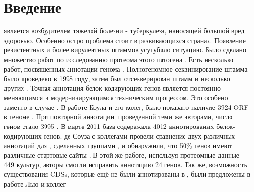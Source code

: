 \section{Введение}
 является возбудителем тяжелой болезни - туберкулеза, наносящей большой вред здоровью. Особенно остро проблема стоит в развивающихся странах. Появление резистентных и более вирулентных штаммов усугубило ситуацию. Было сделано множество работ по исследованию протеома этого патогена \cite{jungblut1999comparative, mattow2006proteins}. Есть несколько работ, посвященных аннотации генома . Полногеномное секвинирование штамма  было проведено в 1998 году, затем был отсекверирован штамм  и несколько других \cite{cole1998erratum, fleischmann2002whole}. Точная аннотация белок-кодирующих генов является постоянно меняющимся и модернизирующимся техническим процессом. Это особено заметно в случае . В работе Коула и его колег, было показано наличие 3924 ORF в геноме  \cite{cole1998erratum}. При повторной аннотации, проведенной теми же авторами, число генов стало 3995 \cite{camus2002re}. В марте 2011 база  содеражала 4012 аннотированых белок-кодирующих генов. де Соуза с коллегами провели сравнение двух различных аннотаций для , сделанных группами , и обнаружили, что 50\% генов имеют различные стартовые сайты \cite{de2008high}. В этой же работе, используя протеомные данные 449 культур, авторы смогли исправить аннотацию 24 генов. Так же, возможность существования CDSs, которые ещё не были аннотированы в , были предложены в работе Лью и коллег \cite{lew2011tuberculist}.

\newpage
